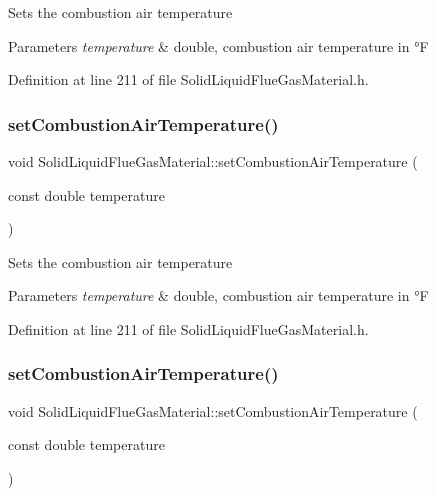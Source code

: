 Sets the combustion air temperature 
\begin{DoxyParams}{Parameters}
{\em temperature} & double, combustion air temperature in °F \\
\hline
\end{DoxyParams}


Definition at line 211 of file Solid\+Liquid\+Flue\+Gas\+Material.\+h.

\mbox{\label{class_solid_liquid_flue_gas_material_a626dfbc9ba87abff99e5c5a8204d69c6}} 
\subsubsection{\texorpdfstring{set\+Combustion\+Air\+Temperature()}{setCombustionAirTemperature()}\hspace{0.1cm}{\footnotesize\ttfamily [2/3]}}
{\footnotesize\ttfamily void Solid\+Liquid\+Flue\+Gas\+Material\+::set\+Combustion\+Air\+Temperature (\begin{DoxyParamCaption}\item[{const double}]{temperature }\end{DoxyParamCaption})\hspace{0.3cm}{\ttfamily [inline]}}

Sets the combustion air temperature 
\begin{DoxyParams}{Parameters}
{\em temperature} & double, combustion air temperature in °F \\
\hline
\end{DoxyParams}


Definition at line 211 of file Solid\+Liquid\+Flue\+Gas\+Material.\+h.

\mbox{\label{class_solid_liquid_flue_gas_material_a626dfbc9ba87abff99e5c5a8204d69c6}} 
\subsubsection{\texorpdfstring{set\+Combustion\+Air\+Temperature()}{setCombustionAirTemperature()}\hspace{0.1cm}{\footnotesize\ttfamily [3/3]}}
{\footnotesize\ttfamily void Solid\+Liquid\+Flue\+Gas\+Material\+::set\+Combustion\+Air\+Temperature (\begin{DoxyParamCaption}\item[{const double}]{temperature }\end{DoxyParamCaption})\hspace{0.3cm}{\ttfamily [inline]}}

